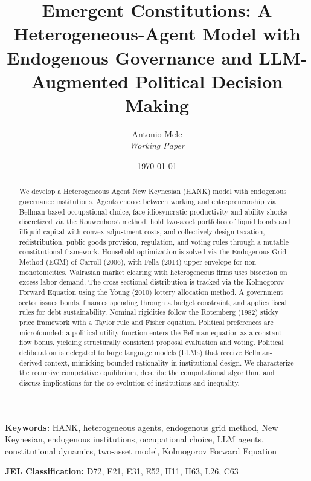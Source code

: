 \documentclass[12pt]{article}
\title{Emergent Constitutions: A Heterogeneous-Agent Model with Endogenous Governance and LLM-Augmented Political Decision Making}
\author{%
  Antonio Mele \\
  \textit{Working Paper}
}
\date{\today}
\begin{document}

\maketitle

\begin{abstract}
We develop a Heterogeneous Agent New Keynesian (HANK) model with endogenous governance institutions. Agents choose between working and entrepreneurship via Bellman-based occupational choice, face idiosyncratic productivity and ability shocks discretized via the Rouwenhorst method, hold two-asset portfolios of liquid bonds and illiquid capital with convex adjustment costs, and collectively design taxation, redistribution, public goods provision, regulation, and voting rules through a mutable constitutional framework. Household optimization is solved via the Endogenous Grid Method (EGM) of Carroll (2006), with Fella (2014) upper envelope for non-monotonicities. Walrasian market clearing with heterogeneous firms uses bisection on excess labor demand. The cross-sectional distribution is tracked via the Kolmogorov Forward Equation using the Young (2010) lottery allocation method. A government sector issues bonds, finances spending through a budget constraint, and applies fiscal rules for debt sustainability. Nominal rigidities follow the Rotemberg (1982) sticky price framework with a Taylor rule and Fisher equation. Political preferences are microfounded: a political utility function enters the Bellman equation as a constant flow bonus, yielding structurally consistent proposal evaluation and voting. Political deliberation is delegated to large language models (LLMs) that receive Bellman-derived context, mimicking bounded rationality in institutional design. We characterize the recursive competitive equilibrium, describe the computational algorithm, and discuss implications for the co-evolution of institutions and inequality.
\end{abstract}

\medskip

\noindent\textbf{Keywords:} HANK, heterogeneous agents, endogenous grid method, New Keynesian, endogenous institutions, occupational choice, LLM agents, constitutional dynamics, two-asset model, Kolmogorov Forward Equation

\medskip

\noindent\textbf{JEL Classification:} D72, E21, E31, E52, H11, H63, L26, C63
\end{document}
